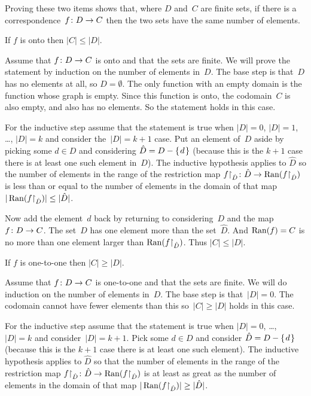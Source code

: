 \documentclass{ibl}  %
\begin{document}
\begin{problem}   \label{CorrespondingSetsHaveSameNumberOfElements}
  Proving these two items shows that, 
  where $D$ and~$C$ are finite sets, 
  if there is a correspondence~$\mbox{$f\colon D\to C$}$
  then the two sets have the same number of elements.
\begin{exes}
\begin{exercise}
  If $f$ is onto then $|C|\leq |D|$.
\end{exercise}
\begin{answer}
  Assume that $\mbox{$f\colon D\to C$}$ is onto and
  that the sets are finite.
  We will prove the statement by induction on the number of elements in~$D$.
  The base step is that~$D$ has no elements at all, so $D=\emptyset$.
  The only function with an empty domain is the function whose graph is 
  empty. 
  Since this function is onto, the codomain~$C$ is also empty, 
  and also has no elements.
  So the statement holds in this case.

  For the inductive step assume that the statement is true when $|D|=0$, 
  $|D|=1$, \ldots, $|D|=k$ and consider the~$|D|=k+1$ case.
  Put an element of~$D$ aside by picking some $d\in D$ and considering 
  $\hat{D}=D-\mbox{$\{\hspace{0.1em}d\hspace{0.1em}\}$}$ (because this is the $k+1$ case there is at least
  one such element in~$D$).
  The inductive hypothesis applies to $\hat{D}$ so the number of elements in
  the range of the restriction map 
  $\mbox{${f}\mathord\upharpoonright_{\hat{D}}\colon \hat{D}\to \operatorname{Ran}({f}\mathord\upharpoonright_{\hat{D}})$}$
  is less than or equal to the number of elements in the domain of that map
  $|\operatorname{Ran}({f}\mathord\upharpoonright_{\hat{D}})|\leq |\hat{D}|$.

  Now add the element~$d$ back by returning to considering~$D$ and the 
  map~$\mbox{$f\colon D\to C$}$.
  The set~$D$ has one element more than the set~$\hat{D}$.
  And $\operatorname{Ran}(f)=C$ is no more than one element larger than
  $\operatorname{Ran}({f}\mathord\upharpoonright_{\hat{D}})$.
  Thus $|C|\leq|D|$.  
\end{answer}
\begin{exercise} 
  If $f$ is one-to-one then $|C|\geq |D|$.
\end{exercise}
\begin{answer}
  Assume that $\mbox{$f\colon D\to C$}$ is one-to-one and
  that the sets are finite.
  We will do induction on the number of elements in~$D$.
  The base step is that~$|D|=0$.
  The codomain cannot have fewer elements than this
  so~$|C|\geq |D|$ holds in this case.

  For the inductive step assume that the statement is true when $|D|=0$, 
  \ldots, $|D|=k$ and consider~$|D|=k+1$.
  Pick some $d\in D$ and consider 
  $\hat{D}=D-\mbox{$\{\hspace{0.1em}d\hspace{0.1em}\}$}$ (because this is the $k+1$ case there is at least
  one such element).
  The inductive hypothesis applies to $\hat{D}$ so that 
  the number of elements in the range of the restriction map 
  $\mbox{${f}\mathord\upharpoonright_{\hat{D}}\colon \hat{D}\to \operatorname{Ran}({f}\mathord\upharpoonright_{\hat{D}})$}$
  is at least as great as the number of elements in the domain of that map
  $|\operatorname{Ran}({f}\mathord\upharpoonright_{\hat{D}})|\geq |\hat{D}|$.


\end{answer}
\end{exes}
\end{problem}
\end{document}
